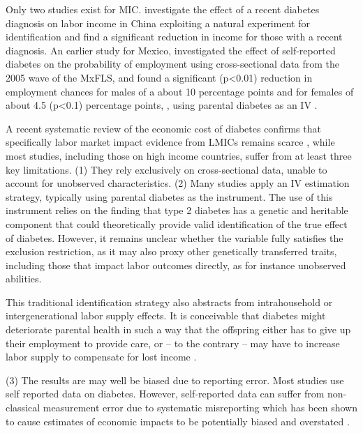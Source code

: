 \documentclass[12pt,english,british]{article}
\begin{document}
Only two studies exist for \ac{MIC}. \citet{Liu2014} investigate the effect of a recent diabetes diagnosis on labor income
in China exploiting a natural experiment for identification and find a
significant reduction in income for those with a recent diagnosis.
An earlier study for Mexico, investigated the effect of self-reported
diabetes on the probability of employment using cross-sectional data from the
2005 wave of the \ac{MxFLS}, and found a significant (p<0.01) reduction
in employment chances for males of a about 10 percentage points and
for females of about 4.5 (p<0.1) percentage points,
, using parental diabetes as an \ac{IV} \citep{Seuring2015}.

A recent systematic review of the economic cost of diabetes confirms that specifically labor market impact evidence from \ac{LMICs} remains scarce \citep{Seuring2015a}, while most studies, including those on high income countries, suffer from at least three key limitations. (1) They rely exclusively on cross-sectional data, unable to account for unobserved characteristics. (2) Many studies apply an \ac{IV} estimation  strategy, typically using parental diabetes as the instrument. 
The use of this instrument relies on the finding that type 2 diabetes has a genetic and heritable component that could theoretically provide valid identification of the true effect of diabetes. However, it remains unclear whether the variable fully satisfies the exclusion restriction, as it may also proxy other genetically transferred traits, including those that impact labor outcomes directly, as for instance unobserved abilities.

This traditional identification strategy also abstracts from intrahousehold or intergenerational labor supply effects. It is conceivable that diabetes might deteriorate parental health in such a way that the offspring either has to give
up their employment to provide care, or -- to the contrary -- may have to increase labor supply to compensate for lost income \citep{Seuring2015}. 

(3) The results are may well be biased due to reporting error. Most studies use self reported data on diabetes. However, self-reported data can suffer from non-classical measurement error
due to systematic misreporting which has been shown to cause estimates
of economic impacts to be potentially biased and overstated  \citep{Cawley2015,ONeill2013,Perks2015}.
\end{document}
